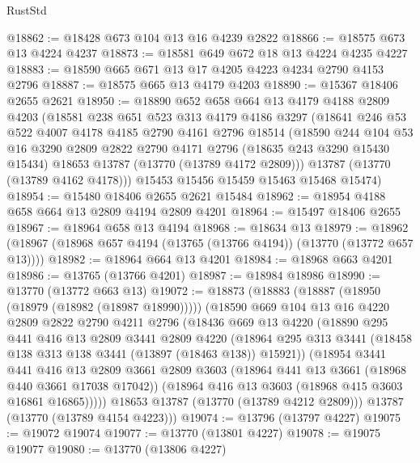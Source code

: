 \begin{lexlean}{RustStd}
\begin{coremodule}
@18862 := @18428 @673 @104 @13 @16 @4239 @2822
@18866 := @18575 @673 @13 @4224 @4237
@18873 := @18581 @649 @672 @18 @13 @4224 @4235 @4227
@18883 := @18590 @665 @671 @13 @17 @4205 @4223 @4234 @2790 @4153 @2796
@18887 := @18575 @665 @13 @4179 @4203
@18890 := @15367 @18406 @2655 @2621
@18950 := @18890
    @652
    @658
    @664
    @13
    @4179
    @4188
    @2809
    @4203
    (@18581
      @238
      @651
      @523
      @313
      @4179
      @4186
      @3297
      (@18641
        @246
        @53
        @522
        @4007
        @4178
        @4185
        @2790
        @4161
        @2796
        @18514
        (@18590
          @244
          @104
          @53
          @16
          @3290
          @2809
          @2822
          @2790
          @4171
          @2796
          (@18635 @243 @3290 @15430 @15434)
          @18653
          @13787
          (@13770 (@13789 @4172 @2809)))
        @13787
        (@13770 (@13789 @4162 @4178)))
      @15453
      @15456
      @15459
      @15463
      @15468
      @15474)
@18954 := @15480 @18406 @2655 @2621 @15484
@18962 := @18954 @4188 @658 @664 @13 @2809 @4194 @2809 @4201
@18964 := @15497 @18406 @2655
@18967 := @18964 @658 @13 @4194
@18968 := @18634 @13
@18979 := @18962 (@18967 (@18968 @657 @4194 (@13765 (@13766 @4194)) (@13770 (@13772 @657 @13))))
@18982 := @18964 @664 @13 @4201
@18984 := @18968 @663 @4201
@18986 := @13765 (@13766 @4201)
@18987 := @18984 @18986
@18990 := @13770 (@13772 @663 @13)
@19072 := @18873
    (@18883
      (@18887 (@18950 (@18979 (@18982 (@18987 @18990)))))
      (@18590
        @669
        @104
        @13
        @16
        @4220
        @2809
        @2822
        @2790
        @4211
        @2796
        (@18436
          @669
          @13
          @4220
          (@18890
            @295
            @441
            @416
            @13
            @2809
            @3441
            @2809
            @4220
            (@18964 @295 @313 @3441 (@18458 @138 @313 @138 @3441 (@13897 (@18463 @138)) @15921))
            (@18954
              @3441
              @441
              @416
              @13
              @2809
              @3661
              @2809
              @3603
              (@18964 @441 @13 @3661 (@18968 @440 @3661 @17038 @17042))
              (@18964 @416 @13 @3603 (@18968 @415 @3603 @16861 @16865)))))
        @18653
        @13787
        (@13770 (@13789 @4212 @2809)))
      @13787
      (@13770 (@13789 @4154 @4223)))
@19074 := @13796 (@13797 @4227)
@19075 := @19072 @19074
@19077 := @13770 (@13801 @4227)
@19078 := @19075 @19077
@19080 := @13770 (@13806 @4227)

\end{coremodule}
\end{lexlean}
